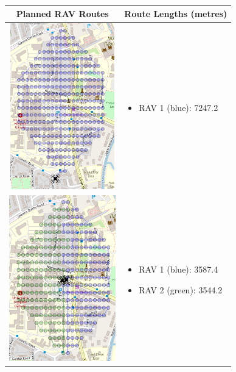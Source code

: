 \begin{table}[H]
  \centering
  \begin{tabular}{ | c | m{4.5cm} | }
    \hline
    Planned RAV Routes & Route Lengths (metres) \\
    \hline
    
    \begin{minipage}[c][74mm][c]{.55\textwidth}
      \includegraphics[width=\linewidth, height=72mm]{Chapters/MultiAgentCoverage/MultipleTravellingSalesman/Figs/Hexagon/OneRAV.PNG}
    \end{minipage}
    &
    \begin{itemize}[leftmargin=*]
      \item[] RAV 1 (blue): 7247.2
    \end{itemize}
    \\
    \hline
    \begin{minipage}[c][74mm][c]{.55\textwidth}
      \includegraphics[width=\linewidth, height=72mm]{Chapters/MultiAgentCoverage/MultipleTravellingSalesman/Figs/Hexagon/TwoRAV.PNG}
    \end{minipage}
    &
    \begin{itemize}[leftmargin=*]
        \item[] RAV 1 (blue): 3587.4
        \item[] RAV 2 (green): 3544.2
    \end{itemize}
    \\
    \hline
    

\end{tabular}
\end{table}
